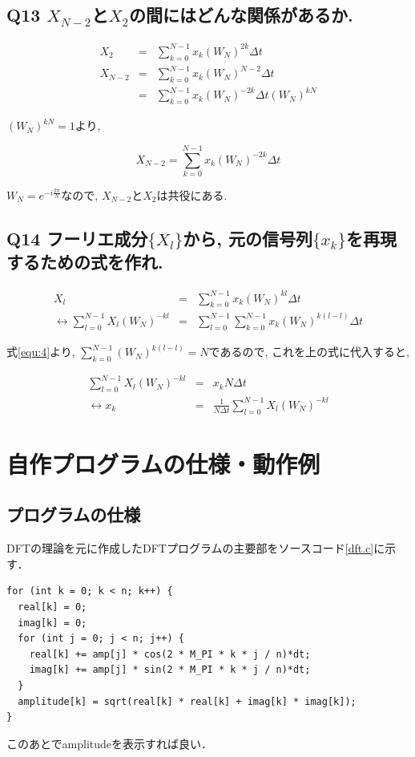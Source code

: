 \documentclass[titlepage]{jarticle}
\begin{document}
\subsection{Q13 $X_{N-2}$と$X_2$の間にはどんな関係があるか.}
\begin{eqnarray}
  X_{2}&=&\sum_{k=0}^{N-1}x_k(W_N)^{2k}\Delta t\nonumber\\
  X_{N-2}&=&\sum_{k=0}^{N-1}x_k(W_N)^{N-2}\Delta t\nonumber\\
  &=&\sum_{k=0}^{N-1}x_k(W_N)^{-2k}\Delta t(W_N)^{kN}\nonumber
\end{eqnarray}

$(W_N)^{kN}=1$より,

\begin{equation*}
  X_{N-2}=\sum_{k=0}^{N-1}x_k(W_N)^{-2k}\Delta t
\end{equation*}

$W_N=e^{-i\frac{2\pi}{N}}$なので,
$X_{N-2}$と$X_2$は共役にある.

\subsection{Q14 フーリエ成分$\{X_l\}$から, 元の信号列$\{x_k\}$を再現するための式を作れ.}
\begin{eqnarray}
  X_l &=& \sum^{N - 1}_{k = 0}x_k(W_N)^{kl}\Delta t \nonumber \\
  \leftrightarrow \sum^{N - 1}_{l = 0}X_l(W_N)^{-kl} &=& \sum^{N - 1}_{l = 0}\sum^{N - 1}_{k = 0}x_k(W_N)^{k(l - l)}\Delta t \nonumber
\end{eqnarray}

式\ref{equ:4}より, $\displaystyle\sum^{N - 1}_{k = 0}(W_N)^{k(l-l)}=N$であるので,
これを上の式に代入すると,

\begin{eqnarray}
  \sum^{N - 1}_{l = 0}X_l(W_N)^{-kl} &=& x_kN\Delta t \nonumber \\
  \leftrightarrow x_k &=& \frac{1}{N\Delta t}\sum^{N - 1}_{l = 0}X_l(W_N)^{-kl} \nonumber
\end{eqnarray}

\section{自作プログラムの仕様・動作例}

\subsection{プログラムの仕様}
DFTの理論を元に作成したDFTプログラムの主要部をソースコード\ref{dft.c}に示す．
\begin{lstlisting}[caption=DFT,label=dft.c]
for (int k = 0; k < n; k++) {
  real[k] = 0;
  imag[k] = 0;
  for (int j = 0; j < n; j++) {
    real[k] += amp[j] * cos(2 * M_PI * k * j / n)*dt;
    imag[k] += amp[j] * sin(2 * M_PI * k * j / n)*dt;
  }
  amplitude[k] = sqrt(real[k] * real[k] + imag[k] * imag[k]);
}
\end{lstlisting}
このあとでamplitudeを表示すれば良い．
\end{document}
